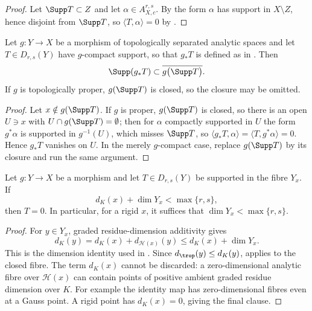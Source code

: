 \begin{proof}
Let $\Supp T\subset Z$ and let $\alpha\in A_{X,c}^{r,s}$.  By
 the form $\alpha$ has support in
$X\setminus Z$, hence disjoint from $\Supp T$, so
$\langle T,\alpha\rangle=0$ by .
\end{proof}

\begin{theorem}
\label{thm:ch14-support-pushforward}
Let $g:Y\to X$ be a morphism of topologically separated analytic spaces and
let $T\in D_{r,s}(Y)$ have $g$-compact support, so that $g_*T$ is defined as
in .  Then
\[
 \Supp(g_*T)\subset \overline{g\bigl(\Supp T\bigr)}.
\]
If $g$ is topologically proper, $g(\Supp T)$ is closed, so the closure may
be omitted.
\end{theorem}

\begin{proof}
Let $x\notin g(\Supp T)$.  If $g$ is proper, $g(\Supp T)$ is closed, so there
is an open $U\ni x$ with $U\cap g(\Supp T)=\emptyset$; then for
$\alpha$ compactly supported in $U$ the form $g^*\alpha$ is supported in
$g^{-1}(U)$, which misses $\Supp T$, so
$\langle g_*T,\alpha\rangle=\langle T,g^*\alpha\rangle=0$.  Hence
$g_*T$ vanishes on $U$.  In the merely $g$-compact case, replace
$g(\Supp T)$ by its closure and run the same argument.
\end{proof}

\begin{proposition}
\label{prop:ch14-support-fibre}
Let $g:Y\to X$ be a morphism and let $T\in D_{r,s}(Y)$ be supported
in the fibre $Y_x$. If
\[
 d_K(x)+\dim Y_x<\max\{r,s\},
\]
then $T=0$. In particular, for a rigid $x$, it suffices that
$\dim Y_x<\max\{r,s\}$.
\end{proposition}

\begin{proof}
For $y\in Y_x$, graded residue-dimension additivity gives
\[
 d_K(y)=d_K(x)+d_{\mathcal H(x)}(y)
       \le d_K(x)+\dim Y_x.
\]
This is the dimension identity used in
\cite[Remark~16.5.2(a)]{CLD25}. Since $d_{\trop}(y)\le d_K(y)$,
 applies to the closed fibre.
The term $d_K(x)$ cannot be discarded: a zero-dimensional analytic
fibre over $\mathcal H(x)$ can contain points of positive ambient
graded residue dimension over $K$. For example the identity map has
zero-dimensional fibres even at a Gauss point. A rigid point has
$d_K(x)=0$, giving the final clause.
\end{proof}

